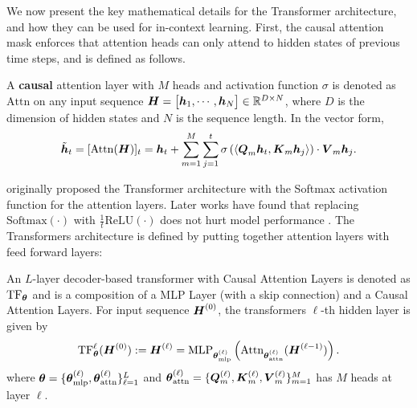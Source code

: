 We now present the key mathematical details for the Transformer architecture, and how  they can be used for in-context learning.
First, the causal attention mask enforces that attention heads can only attend to hidden states of previous time steps, and is defined as follows.


\begin{definition}\label{def:attn}
    A \textbf{causal} attention layer with $M$ heads and activation function $\sigma$  is denoted as $\mathrm{Attn}$ on any input sequence $\boldsymbol{H} = \begin{bmatrix}
        \boldsymbol{h}_1, \cdots, \boldsymbol{h}_N
    \end{bmatrix} \in \mathbb R^{D \times N}$, where $D$ is the dimension of hidden states and $N$ is the sequence length. In the vector form,
    \begin{equation}
        \tilde{\boldsymbol{h}}_t = [\mathrm{Attn}(\boldsymbol{H})]_t = \boldsymbol{h}_t +  \sum_{m=1}^M \sum_{j=1}^t \sigma \left(\left\langle {\boldsymbol{Q}_m \boldsymbol{h}_t, \boldsymbol{K}_m \boldsymbol{h}_j} \right\rangle\right) \cdot \boldsymbol{V}_m \boldsymbol{h}_j.
    \end{equation}
\end{definition}
\citet{Vaswani2017AttentionIA} originally proposed the Transformer architecture with the Softmax activation function for the attention layers. Later works have found that replacing $\mathrm{Softmax}(\cdot)$ with $\frac{1}{t} \mathrm{ReLU}(\cdot)$ does not hurt model performance \citep{Cai2022EfficientViTEL,shen2023study,wortsman2023replacing}. The Transformers architecture is defined by putting together attention layers with feed forward layers: 



\begin{definition}[Transformers]
    An $L$-layer decoder-based transformer with Causal Attention Layers is denoted as $\mathrm{TF}_{\boldsymbol{\theta}}$ and is a composition of a MLP Layer (with a skip connection) and a Causal Attention Layers. For input sequence $\boldsymbol{H}^{(0)}$, the transformers $\ell$-th hidden layer is given by
    \begin{equation}
      \mathrm{TF}_{\boldsymbol{\theta}}^{\ell}(\boldsymbol{H}^{(0)}) :=  \boldsymbol{H}^{(\ell)} = \mathrm{MLP}_{\boldsymbol{\theta}_\mathrm{mlp}^{(\ell)}} \left(\mathrm{Attn}_{\boldsymbol{\theta}_\mathrm{attn}^{(\ell)}} (\boldsymbol{H}^{(\ell-1)})\right). \nonumber
    \end{equation}
    where $\boldsymbol{\theta} = \{\boldsymbol{\theta}_\mathrm{mlp}^{(\ell)}, \boldsymbol{\theta}_\mathrm{attn}^{(\ell)}\}_{\ell=1}^L$ and $\boldsymbol{\theta}_\mathrm{attn}^{(\ell)} = \{\boldsymbol{Q}_m^{(\ell)}, \boldsymbol{K}_m^{(\ell)}, \boldsymbol{V}_m^{(\ell)}\}_{m=1}^M$ has $M$ heads at layer $\ell$. 
\label{def:transformers}
\end{definition}

